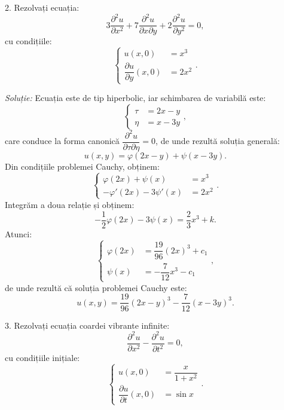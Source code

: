 \vspace{0.3cm}

2. Rezolvați ecuația:
\[
    3 \dfrac{\partial^2 u}{\partial x^2} + 7 \dfrac{\partial^2 u}{\partial x\partial y} + %
    2 \dfrac{\partial^2 u}{\partial y^2} = 0,
\]
cu condițiile:
\[
    \begin{cases}
        u(x, 0) &= x^3 \\
        \dfrac{\partial u}{\partial y}(x, 0) &= 2x^2
    \end{cases}.
\]

\vspace{0.3cm}

\emph{Soluție:} Ecuația este de tip hiperbolic, iar schimbarea de variabilă este:
\[
    \begin{cases}
        \tau &= 2x - y \\
        \eta &= x - 3y
    \end{cases},
\]
care conduce la forma canonică $ \dfrac{\partial^2 u}{\partial \tau\partial \eta} = 0 $,
de unde rezultă soluția generală:
\[
    u(x, y) = \varphi(2x - y) + \psi(x - 3y).
\]
Din condițiile problemei Cauchy, obținem:
\[
    \begin{cases}
        \varphi(2x) + \psi(x) &= x^3 \\
        -\varphi'(2x) - 3 \psi'(x) &= 2x^2
    \end{cases}.
\]
Integrăm a doua relație și obținem:
\[
    -\dfrac{1}{2} \varphi(2x) - 3 \psi(x) = \dfrac{2}{3}x^3 + k.
\]
Atunci:
\[
    \begin{cases}
        \varphi(2x) &= \dfrac{19}{96}(2x)^3 + c_1 \\
        \psi(x) &= -\dfrac{7}{12}x^3 - c_1
    \end{cases},
\]
de unde rezultă că soluția problemei Cauchy este:
\[
    u(x, y) = \dfrac{19}{96}(2x - y)^3 - \dfrac{7}{12}(x - 3y)^3.
\]

3. Rezolvați ecuația coardei vibrante infinite:
\[
    \dfrac{\partial^2 u}{\partial x^2} - \dfrac{\partial^2 u}{\partial t^2} = 0,
\]
cu condițiile inițiale:
\[
    \begin{cases}
        u(x, 0) &= \dfrac{x}{1 + x^2} \\
        \dfrac{\partial u}{\partial t}(x, 0) &= \sin x
    \end{cases}.
\]

\vspace{0.3cm}

